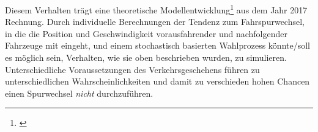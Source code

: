 Diesem Verhalten trägt eine theoretische Modellentwicklung\footnote{\cite{dat-ba}} aus dem Jahr 2017 Rechnung.
Durch individuelle Berechnungen der Tendenz zum Fahrspurwechsel, in die die Position und Geschwindigkeit vorausfahrender und nachfolgender Fahrzeuge mit eingeht, und einem stochastisch basierten Wahlprozess könnte/soll es möglich sein, Verhalten, wie sie oben beschrieben wurden, zu simulieren.
Unterschiedliche Voraussetzungen des Verkehrsgeschehens führen zu unterschiedlichen Wahrscheinlichkeiten und damit zu verschieden hohen Chancen einen Spurwechsel \textit{nicht} durchzuführen.

